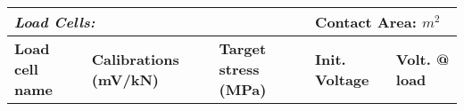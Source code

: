 \documentclass[letterpaper, 10pt]{article}
\begin{document}
\begin{table}[ht!]
        \renewcommand{\arraystretch}{1.5}
        \begin{tabular}{ |p{2.75cm}|p{4cm}|p{3.5cm}|p{2.5cm}| p{3cm}| }
            \multicolumn{3}{l}{\textbf{\textit{Load Cells:}}} & \multicolumn{2}{l}{Contact Area:  $ m^2 $}\\ \hline
            \textbf{Load cell name} & \textbf{Calibrations (mV/kN)} & \textbf{Target stress (MPa)} & \textbf{Init. Voltage} & \textbf{Volt. @ load}\\
            \hline
            


    \end{tabular}
    \end{table} \vspace{-0.5cm} 
\end{document}
